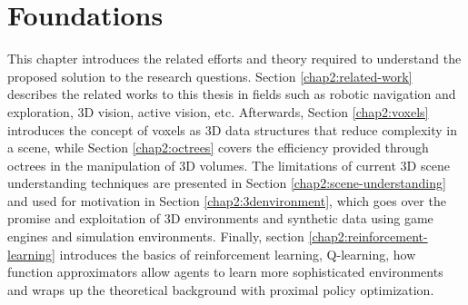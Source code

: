 \chapter{Foundations}\label{chap2:title}
This chapter introduces the related efforts and theory required to understand the proposed solution to the research questions. 
Section \ref{chap2:related-work} describes the related works to this thesis in fields such as robotic navigation and exploration, 3D vision, active vision, etc.
Afterwards, Section \ref{chap2:voxels} introduces the concept of voxels as 3D data structures that reduce complexity in a scene, 
while Section \ref{chap2:octrees} covers the efficiency provided through octrees in the manipulation of 3D volumes. 
The limitations of current 3D scene understanding techniques are presented in Section \ref{chap2:scene-understanding} and used for motivation in Section \ref{chap2:3denvironment}, which goes over the promise and exploitation of 3D environments and synthetic data using game engines and simulation environments.
Finally, section \ref{chap2:reinforcement-learning} introduces the basics of reinforcement learning, Q-learning, how function approximators allow agents to learn more sophisticated environments and wraps up the theoretical background with proximal policy optimization.

